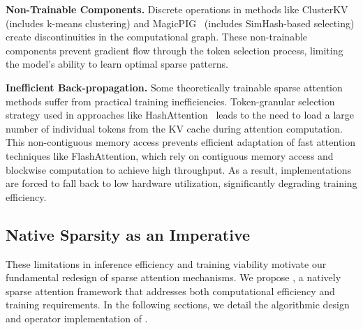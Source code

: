 \textbf{Non-Trainable Components.} Discrete operations in methods like ClusterKV~\citep{clusterkv} 
(includes k-means clustering) and MagicPIG~\citep{magicpig} (includes SimHash-based selecting) create discontinuities in the computational graph. These non-trainable components prevent gradient flow through the token selection process, limiting the model's ability to learn optimal sparse patterns. 

\textbf{Inefficient Back-propagation.} Some theoretically trainable sparse attention methods suffer from practical training inefficiencies. Token-granular selection strategy used in approaches like HashAttention~\citep{desai2024hashattention} leads to the need to load a large number of individual tokens from the KV cache during attention computation. 
This non-contiguous memory access prevents efficient adaptation of fast attention techniques like FlashAttention, which rely on contiguous memory access and blockwise computation to achieve high throughput.
As a result, implementations are forced to fall back to low hardware utilization, significantly degrading training efficiency.



\subsection{Native Sparsity as an Imperative}

These limitations in inference efficiency and training viability motivate our fundamental redesign of sparse attention mechanisms.
We propose \method{}, a natively sparse attention framework that addresses both computational efficiency and training requirements.
In the following sections, we detail the algorithmic design and operator implementation of \method{}.
